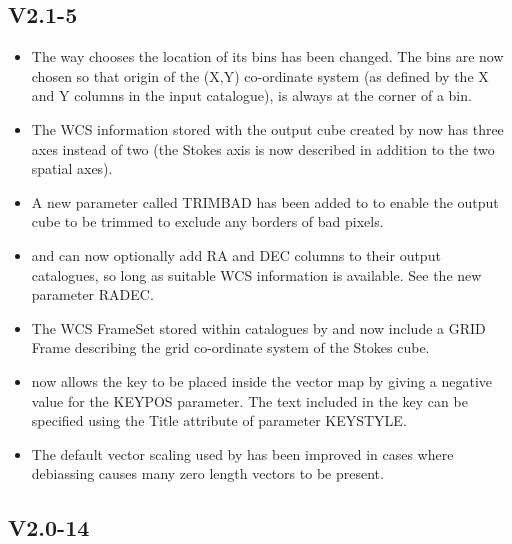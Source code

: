 \documentclass[twoside,11pt]{starlink}
\begin{document}
\subsection{V2.1-5}

\begin{itemize}
\item The way  chooses the location of its bins
has been changed. The bins are now chosen so that origin of the (X,Y)
co-ordinate system (as defined by the X and Y columns in the input
catalogue), is always at the corner of a bin.

\item The WCS information stored with the output cube created by
 now has three axes instead of two (the Stokes
axis is now described in addition to the two spatial axes).

\item A new parameter called TRIMBAD has been added to 
to enable the output cube to be trimmed to exclude any borders of bad pixels.

\item {} and  can now
optionally add RA and DEC columns to their output catalogues, so long as
suitable WCS information is available. See the new parameter RADEC.

\item The WCS FrameSet stored within catalogues by 
and  now include a GRID Frame describing the
grid co-ordinate system of the Stokes cube.

\item {} now allows the key to be placed inside the
vector map by giving a negative value for the KEYPOS parameter. The text
included in the key can be specified using the Title attribute of
parameter KEYSTYLE.

\item The default vector scaling used by  has been
improved in cases where debiassing causes many zero length vectors to be
present.

\end{itemize}

\subsection{V2.0-14}
\end{document}
